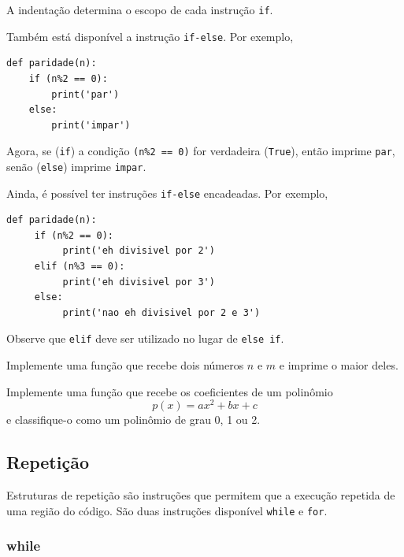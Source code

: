 \documentclass[12pt]{article}
\begin{document}
\begin{obs}
  A indentação determina o escopo de cada instrução \lstinline+if+.
\end{obs}

Também está disponível a instrução \lstinline+if-else+. Por exemplo,

\begin{lstlisting}
def paridade(n):
    if (n%2 == 0):
        print('par')
    else:
        print('impar')    
\end{lstlisting}

Agora, se (\lstinline+if+) a condição \lstinline!(n%2 == 0)! for verdadeira (\lstinline+True+), então imprime \lstinline+par+, senão (\lstinline+else+) imprime \lstinline+impar+.

Ainda, é possível ter instruções \lstinline+if-else+ encadeadas. Por exemplo,

\begin{lstlisting}
def paridade(n):
     if (n%2 == 0):
          print('eh divisivel por 2')
     elif (n%3 == 0):
          print('eh divisivel por 3')
     else:
          print('nao eh divisivel por 2 e 3')    
\end{lstlisting}

Observe que \lstinline+elif+ deve ser utilizado no lugar de \lstinline+else if+.

\begin{exr}
  Implemente uma função que recebe dois números $n$ e $m$ e imprime o maior deles.
\end{exr}

\begin{exr}
  Implemente uma função que recebe os coeficientes de um polinômio
  \begin{equation}
    p(x) = ax^2 + bx + c
  \end{equation}
  e classifique-o como um polinômio de grau 0, 1 ou 2.
\end{exr}

\subsection{Repetição}

Estruturas de repetição são instruções que permitem que a execução repetida de uma região do código. São duas instruções disponível \lstinline+while+ e \lstinline+for+.

\subsubsection{while}
\end{document}
